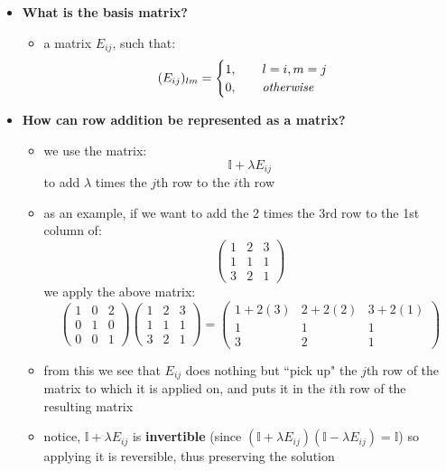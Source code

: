 \documentclass{exam}
\begin{document}
\begin{itemize}
    \item \textbf{What is the basis matrix?}
    \begin{itemize}
        \item a matrix $E_{ij}$, such that:
        \[
        (E_{ij})_{lm} = \begin{cases}
        1, \qquad l = i, m = j \\
        0, \qquad \text{\textit{otherwise}}
        \end{cases}
        \]
    \end{itemize}
    \item \textbf{How can row addition be represented as a matrix?}
    \begin{itemize}
        \item we use the matrix:
        \[
        \mathbb{I} + \lambda E_{ij}
        \]
        to add $\lambda$ times the $j$th row to the $i$th row
        \item as an example, if we want to add the 2 times the 3rd row to the 1st column of:
        \[\begin{pmatrix}
        1 & 2 & 3 \\
        1 & 1 & 1 \\
        3 & 2 & 1
        \end{pmatrix}
        \]
        we apply the above matrix:
        \[
        \begin{pmatrix}
        1 & 0 & 2 \\
        0 & 1 & 0 \\
        0 & 0 & 1
        \end{pmatrix}
        \begin{pmatrix}
        1 & 2 & 3 \\
        1 & 1 & 1 \\
        3 & 2 & 1
        \end{pmatrix}
        = \begin{pmatrix}
        1 + 2(3) & 2 + 2(2) & 3 + 2(1) \\
        1 & 1 & 1 \\
        3 & 2 & 1
        \end{pmatrix}
        \]
        \item from this we see that $E_{ij}$ does nothing but ``pick up" the $j$th row of the matrix to which it is applied on, and puts it in the $i$th row of the resulting matrix
        \item notice, $\mathbb{I} + \lambda E_{ij}$ is \textbf{invertible} (since $(\mathbb{I} + \lambda E_{ij})(\mathbb{I} - \lambda E_{ij}) = \mathbb{I}$) so applying it is reversible, thus preserving the solution

\end{itemize}
\end{itemize}
\end{document}
